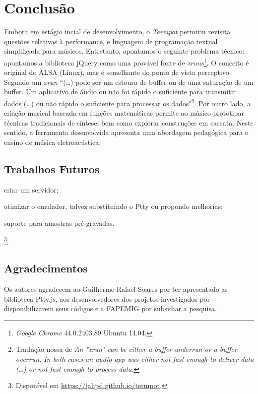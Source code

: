 \section{Conclusão}\label{sec:conclusao}

Embora em estágio incial de desenvolvimento, o \emph{Termpot} permitiu revisita questões relativas à performance, e linguagem de programação textual simplificada para músicos. Entretanto, apontamos o seguinte problema técnico: apontamos a biblioteca jQuery como uma provável fonte de \emph{xruns}\footnote{\emph{Google Chrome} 44.0.2403.89 Ubuntu 14.04.}. O conceito é original do ALSA (Linux), mas é semelhante do ponto de vista perceptivo. Segundo \cite{markc_xruns_2013}  um \emph{xrun} ``(\ldots) pode ser um estouro de buffer ou de uma saturação de um buffer. Um aplicativo de áudio ou não foi rápido o suficiente para transmitir dados (\ldots) ou não rápido o suficiente para processar os dados"\footnote{Tradução nossa de \emph{An "xrun" can be either a buffer underrun or a buffer overrun. In both cases an audio app was either not fast enough to deliver data (\ldots)  or not fast enough to process data}.}. Por outro lado, a criação musical baseada em funções matemáticas permite ao músico prototipar técnicas tradicionais de síntese, bem como explorar construções em cascata. Neste sentido, a ferramenta desenvolvida apresenta uma abordagem pedagógica para o ensino de música eletroacústica.

\subsection{Trabalhos Futuros}

\begin{inparaenum}
\item criar um servidor;
\item otimizar o emulador, talvez substituindo o Ptty ou propondo melhorias;
\item suporte para amostras pré-gravadas.
\end{inparaenum}

\footnote{Disponível em  \url{https://jahpd.github.io/termpot}.}. 

\subsection{Agradecimentos}

Os autores agradecem ao Guilherme Rafael Soares por ter apresentado as biblioteca Ptty.js, aos desenvolvedores dos projetos investigados por disponibilizarem seus códigos e a FAPEMIG por subsidiar a pesquisa.
